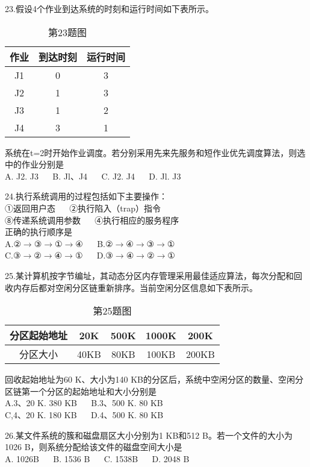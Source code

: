 23.假设4个作业到达系统的时刻和运行时间如下表所示。
\begin{table}[ht]
\centering
\caption{第23题图}\label{tab_CSN17_1}
\begin{tabular}{|c|c|c|}
\hline
作业 & 到达时刻 & 运行时间 \\
\hline
J1 & 0 & 3 \\
\hline
J2 & 1 & 3 \\
\hline
J3 & 1 & 2 \\
\hline
J4 & 3 & 1 \\
\hline
\end{tabular}
\end{table}
系统在t=2时开始作业调度。若分别采用先来先服务和短作业优先调度算法，则选中的作业分别是 \\
A. J2. J3  $\quad$  B. Jl、J4  $\quad$  C. J2. J4  $\quad$  D. Jl. J3

24.执行系统调用的过程包括如下主要操作： \\
①返回用户态  $\quad$  ②执行陷入（trap）指令 \\
⑧传递系统调用参数  $\quad$ ④执行相应的服务程序 \\
正确的执行顺序是 \\
A.②$\rightarrow$③$\rightarrow$①$\rightarrow$④ $\quad$ B.②$\rightarrow$④$\rightarrow$③$\rightarrow$① \\
C.③$\rightarrow$②$\rightarrow$④$\rightarrow$① $\quad$ D.③$\rightarrow$④$\rightarrow$②$\rightarrow$①

25.某计算机按字节编址，其动态分区内存管理采用最佳适应算法，每次分配和回收内存后都对空闲分区链重新排序。当前空闲分区信息如下表所示。 \\
\begin{table}[ht]
\centering
\caption{第25题图}\label{tab_CSN17_2}
\begin{tabular}{|c|c|c|c|c|}
\hline
分区起始地址 & 20K & 500K & 1000K & 200K \\
\hline
分区大小 & 40KB & 80KB & 100KB & 200KB \\
\hline
\end{tabular}
\end{table}
回收起始地址为60 K、大小为140 KB的分区后，系统中空闲分区的数量、空闲分区链第一个分区的起始地址和大小分别是 \\
A.3、20 K. 380 KB  $\quad$  B.3、500 K.  80 KB \\
C,4、20 K.  180 KB  $\quad$  D.4、500 K.  80 KB

26.某文件系统的簇和磁盘扇区大小分别为1 KB和512 B。若一个文件的大小为1026 B，则系统分配给该文件的磁盘空间大小是 \\
A. 1026B  $\quad$  B.  1536 B  $\quad$  C. 1538B  $\quad$  D.  2048 B

